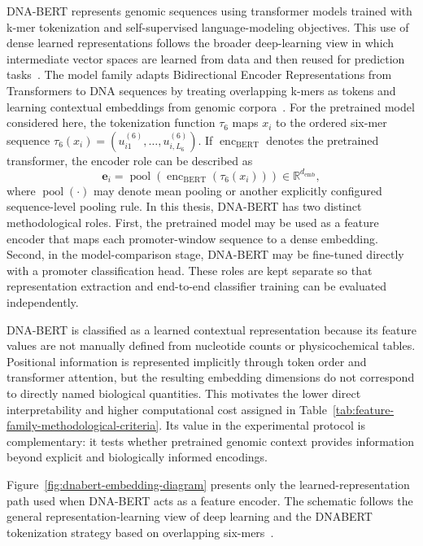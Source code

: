 DNA-BERT represents genomic sequences using transformer models trained with k-mer tokenization and self-supervised language-modeling objectives. This use of dense learned representations follows the broader deep-learning view in which intermediate vector spaces are learned from data and then reused for prediction tasks~\citep{goodfellow2016deep}. The model family adapts Bidirectional Encoder Representations from Transformers to DNA sequences by treating overlapping k-mers as tokens and learning contextual embeddings from genomic corpora~\citep{ji2021dnabert}. For the pretrained model considered here, the tokenization function $\tau_6$ maps $x_i$ to the ordered six-mer sequence $\tau_6(x_i)=(u_{i1}^{(6)},\ldots,u_{i,L_6}^{(6)})$. If $\operatorname{enc}_{\mathrm{BERT}}$ denotes the pretrained transformer, the encoder role can be described as
\begin{equation}
\mathbf{e}_i=\operatorname{pool}\left(\operatorname{enc}_{\mathrm{BERT}}\left(\tau_6(x_i)\right)\right)\in\mathbb{R}^{d_{\mathrm{emb}}},
\end{equation}
where $\operatorname{pool}(\cdot)$ may denote mean pooling or another explicitly configured sequence-level pooling rule. In this thesis, DNA-BERT has two distinct methodological roles. First, the pretrained model may be used as a feature encoder that maps each promoter-window sequence to a dense embedding. Second, in the model-comparison stage, DNA-BERT may be fine-tuned directly with a promoter classification head. These roles are kept separate so that representation extraction and end-to-end classifier training can be evaluated independently.

DNA-BERT is classified as a learned contextual representation because its feature values are not manually defined from nucleotide counts or physicochemical tables. Positional information is represented implicitly through token order and transformer attention, but the resulting embedding dimensions do not correspond to directly named biological quantities. This motivates the lower direct interpretability and higher computational cost assigned in Table~\ref{tab:feature-family-methodological-criteria}. Its value in the experimental protocol is complementary: it tests whether pretrained genomic context provides information beyond explicit and biologically informed encodings.

Figure~\ref{fig:dnabert-embedding-diagram} presents only the learned-representation path used when DNA-BERT acts as a feature encoder. The schematic follows the general representation-learning view of deep learning and the DNABERT tokenization strategy based on overlapping six-mers~\citep{goodfellow2016deep,ji2021dnabert}.

